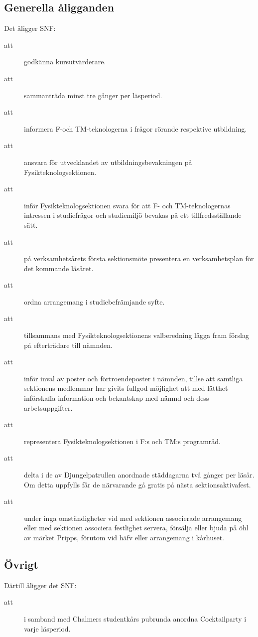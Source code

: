 \documentclass[a4paper]{article}
\begin{document}
\begin{foreningenv}{\forening{}}
    \section{Generella åligganden}
    Det åligger SNF:
    \begin{description}
        \item[att] godkänna kursutvärderare.
        \item[att] sammanträda minst tre gånger per läsperiod.
        \item[att] informera F-och TM-teknologerna i frågor rörande respektive utbildning.
        \item[att] ansvara för utvecklandet av utbildningsbevakningen på Fysikteknologsektionen.
        \item[att] inför Fysikteknologsektionen svara för att F- och TM-teknologernas intressen i studiefrågor och studiemiljö bevakas på ett tillfredsställande sätt.
        \item[att] på verksamhetsårets första sektionsmöte presentera en verksamhetsplan för det kommande läsåret.
        \item[att] ordna arrangemang i studiebefrämjande syfte.
        \item[att] tillsammans med Fysikteknologsektionens valberedning lägga fram förslag på efterträdare till nämnden.
        \item[att] inför inval av poster och förtroendeposter i nämnden, tillse att samtliga sektionens medlemmar har givits fullgod möjlighet att med lätthet införskaffa information och bekantskap med nämnd och dess arbetsuppgifter.
        \item[att] representera Fysikteknologsektionen i F:s och TM:s programråd.
        \item[att] delta i de av Djungelpatrullen anordnade städdagarna två gånger per läsår. Om detta uppfylls får de närvarande gå gratis på nästa sektionsaktivafest.
        \item[att] under inga omständigheter vid med sektionen associerade arrangemang eller med sektionen associera festlighet servera, försälja eller bjuda på öhl av märket Pripps, förutom vid häfv eller arrangemang i kårhuset.
    \end{description}
    
    \subsection{Övrigt}
    Därtill åligger det SNF:
    \begin{description}
        \item[att] i samband med Chalmers studentkårs pubrunda anordna Cocktailparty i varje läsperiod.
    \end{description}
    

\end{foreningenv}
\end{document}
